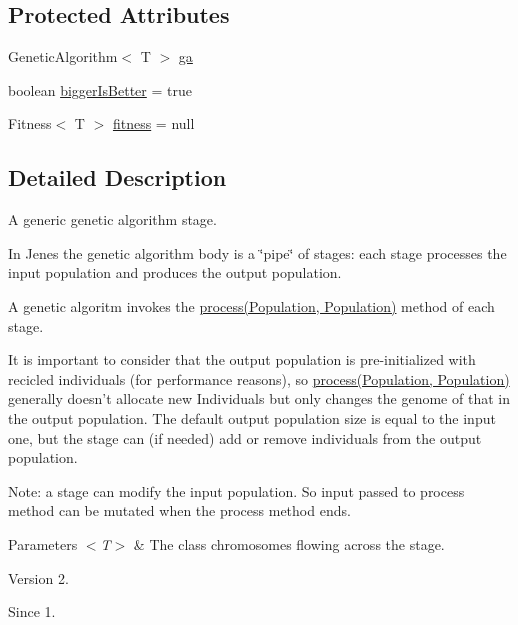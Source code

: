 \subsection*{Protected Attributes}
\begin{DoxyCompactItemize}
\item 
Genetic\-Algorithm$<$ T $>$ \hyperlink{classjenes_1_1stage_1_1_abstract_stage_3_01_t_01extends_01_chromosome_01_4_a751aba4f46b29d22592d48422ffa75f9}{ga}
\item 
boolean \hyperlink{classjenes_1_1stage_1_1_abstract_stage_3_01_t_01extends_01_chromosome_01_4_a11da35af3fe950eef9882b03e13690d4}{bigger\-Is\-Better} = true
\item 
Fitness$<$ T $>$ \hyperlink{classjenes_1_1stage_1_1_abstract_stage_3_01_t_01extends_01_chromosome_01_4_a697ab8239c1ae2a99445cd7f5fbca45d}{fitness} = null
\end{DoxyCompactItemize}


\subsection{Detailed Description}
A generic genetic algorithm stage.\par
 \par
 In Jenes the genetic algorithm body is a \char`\"{}pipe\char`\"{} of stages\-: each stage processes the input population and produces the output population.\par
 A genetic algoritm invokes the \hyperlink{}{process(\-Population, Population)} method of each stage. \par
 It is important to consider that the output population is pre-\/initialized with recicled individuals (for performance reasons), so \hyperlink{}{process(\-Population, Population)} generally doesn't allocate new Individuals but only changes the genome of that in the output population. The default output population size is equal to the input one, but the stage can (if needed) add or remove individuals from the output population. \par
\par
 Note\-: a stage can modify the input population. So input passed to process method can be mutated when the process method ends.


\begin{DoxyParams}{Parameters}
{\em $<$\-T$>$} & The class chromosomes flowing across the stage.\\
\hline
\end{DoxyParams}
\begin{DoxyVersion}{Version}
2. 
\end{DoxyVersion}
\begin{DoxySince}{Since}
1. 
\end{DoxySince}


